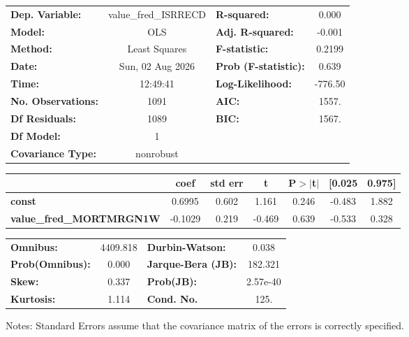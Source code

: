 \begin{center}
\begin{tabular}{lclc}
\toprule
\textbf{Dep. Variable:}          & value\_fred\_ISRRECD & \textbf{  R-squared:         } &     0.000   \\
\textbf{Model:}                  &         OLS          & \textbf{  Adj. R-squared:    } &    -0.001   \\
\textbf{Method:}                 &    Least Squares     & \textbf{  F-statistic:       } &    0.2199   \\
\textbf{Date:}                   &   Sun, 02 Aug 2026   & \textbf{  Prob (F-statistic):} &    0.639    \\
\textbf{Time:}                   &       12:49:41       & \textbf{  Log-Likelihood:    } &   -776.50   \\
\textbf{No. Observations:}       &          1091        & \textbf{  AIC:               } &     1557.   \\
\textbf{Df Residuals:}           &          1089        & \textbf{  BIC:               } &     1567.   \\
\textbf{Df Model:}               &             1        & \textbf{                     } &             \\
\textbf{Covariance Type:}        &      nonrobust       & \textbf{                     } &             \\
\bottomrule
\end{tabular}
\begin{tabular}{lcccccc}
                                 & \textbf{coef} & \textbf{std err} & \textbf{t} & \textbf{P$> |$t$|$} & \textbf{[0.025} & \textbf{0.975]}  \\
\midrule
\textbf{const}                   &       0.6995  &        0.602     &     1.161  &         0.246        &       -0.483    &        1.882     \\
\textbf{value\_fred\_MORTMRGN1W} &      -0.1029  &        0.219     &    -0.469  &         0.639        &       -0.533    &        0.328     \\
\bottomrule
\end{tabular}
\begin{tabular}{lclc}
\textbf{Omnibus:}       & 4409.818 & \textbf{  Durbin-Watson:     } &    0.038  \\
\textbf{Prob(Omnibus):} &   0.000  & \textbf{  Jarque-Bera (JB):  } &  182.321  \\
\textbf{Skew:}          &   0.337  & \textbf{  Prob(JB):          } & 2.57e-40  \\
\textbf{Kurtosis:}      &   1.114  & \textbf{  Cond. No.          } &     125.  \\
\bottomrule
\end{tabular}
\end{center}

Notes: \newline
 [1] Standard Errors assume that the covariance matrix of the errors is correctly specified.